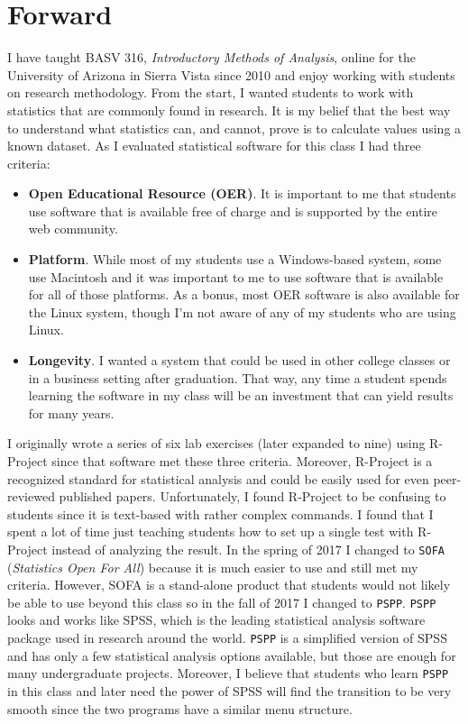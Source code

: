 \chapter*{Forward}\label{for:forward}

I have taught BASV 316, \textit{Introductory Methods of Analysis}, online for the University of Arizona in Sierra Vista since 2010 and enjoy working with students on research methodology. From the start, I wanted students to work with statistics that are commonly found in research. It is my belief that the best way to understand what statistics can, and cannot, prove is to calculate values using a known dataset. As I evaluated statistical software for this class I had three criteria:

\begin{itemize}
  \item \textbf{Open Educational Resource (OER)}. It is important to me that students use software that is available free of charge and is supported by the entire web community. 
  \item \textbf{Platform}. While most of my students use a Windows-based system, some use Macintosh and it was important to me to use software that is available for all of those platforms. As a bonus, most OER software is also available for the Linux system, though I'm not aware of any of my students who are using Linux.
  \item \textbf{Longevity}. I wanted a system that could be used in other college classes or in a business setting after graduation. That way, any time a student spends learning the software in my class will be an investment that can yield results for many years.
\end{itemize}

I originally wrote a series of six lab exercises (later expanded to nine) using R-Project since that software met these three criteria. Moreover, R-Project is a recognized standard for statistical analysis and could be easily used for even peer-reviewed published papers. Unfortunately, I found R-Project to be confusing to students since it is text-based with rather complex commands. I found that I spent a lot of time just teaching students how to set up a single test with R-Project instead of analyzing the result. In the spring of 2017 I changed to \texttt{SOFA} (\textit{Statistics Open For All}) because it is much easier to use and still met my criteria. However, SOFA is a stand-alone product that students would not likely be able to use beyond this class so in the fall of 2017 I changed to \texttt{PSPP}. \texttt{PSPP} looks and works like SPSS, which is the leading statistical analysis software package used in research around the world. \texttt{PSPP} is a simplified version of SPSS and has only a few statistical analysis options available, but those are enough for many undergraduate projects. Moreover, I believe that students who learn \texttt{PSPP} in this class and later need the power of SPSS will find the transition to be very smooth since the two programs have a similar menu structure.

